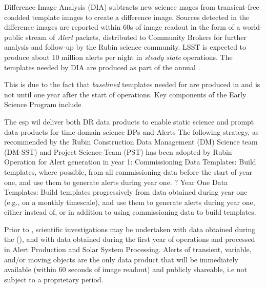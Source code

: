 
Difference Image Analysis (DIA) subtracts new science mages  from transient-free coadded template images  to create a difference image. 
Sources detected in the difference images are reported within 60s of image readout in the form of a world-public stream of {\it Alert} packets, distributed to Community Brokers for further analysis and follow-up by the Rubin science community. 
LSST is expected to produce about 10 million alerts per night in {\it steady state} operations. 
The templates needed by DIA are produced as part of the annual \drp. 

This is due to the fact that {\it baselined} templates needed for \diffim are produced in \drp and \drone is not until one year after the start of operations.
Key components of the Early Science Program include

The esp wil deliver both DR data products to enable static science and prompt data products  for time-domain science 
DPs and Alerts  
The following strategy, as recommended by the  Rubin Construction Data Management (DM) Science team (DM-SST) and  Project Science Team (PST) has been adopted by Rubin Operation for Alert generation in year 1: 
Commissioning Data Templates: Build templates, where possible, from all commissioning data before the start of year one, and use them to generate alerts during year one.
? Year One Data Templates: Build templates progressively from data obtained during year
one (e.g., on a monthly timescale), and use them to generate alerts during year one,
either instead of, or in addition to using commissioning data to build templates.





Prior to \drone, scientific investigations may be undertaken with data obtained during the \svs (\citep{}), and with data obtained during the first year of operations and processed in Alert Production and Solar System Processing. 
Alerts of transient, variable, and/or moving objects are the only data product that will be immediately available (within 60 seconds of image readout) and publicly shareable, i.e not subject to a proprietary period. 

